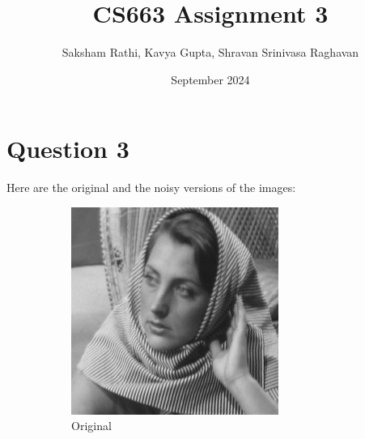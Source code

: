 \documentclass[12pt]{article}
\title{{\bf CS663 Assignment 3}}
\author{Saksham Rathi, Kavya Gupta, Shravan Srinivasa Raghavan}
\date{September 2024}
\begin{document}
\maketitle
\clearpage
\section*{Question 3}
Here are the original and the noisy versions of the images:
\begin{figure}[h]
    \centering
    \begin{subfigure}[b]{0.3\textwidth}
        \centering
        \includegraphics[width=\textwidth]{../images/barbara256.png}
        \caption{Original}
        \label{fig:subfig1}
    \end{subfigure}
    \begin{subfigure}[b]{0.3\textwidth}
        \centering

\end{subfigure}
\end{figure}
\end{document}
